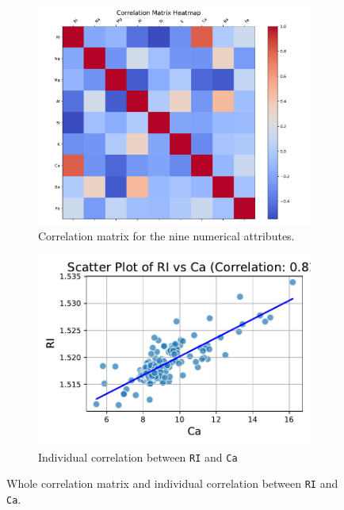 \documentclass[dtu]{dtuarticle}
\begin{document}
	\begin{figure}
		\centering
		\begin{subfigure}{.49\textwidth}
			\centering
			\includegraphics[width=\textwidth]{figures/correlation_matrix}
			\caption{Correlation matrix for the nine numerical attributes.}
			\label{fig:correlation}
		\end{subfigure}
		\begin{subfigure}{.49\textwidth}
			\centering
			\includegraphics[width=\textwidth]{figures/scatter_RI_vs_Ca}
			\caption{Individual correlation between \texttt{RI} and \texttt{Ca}}
			\label{fig:individual-correlation}
		\end{subfigure}
		\caption{Whole correlation matrix and individual correlation between \texttt{RI} and \texttt{Ca}.}
	\end{figure}
\end{document}
